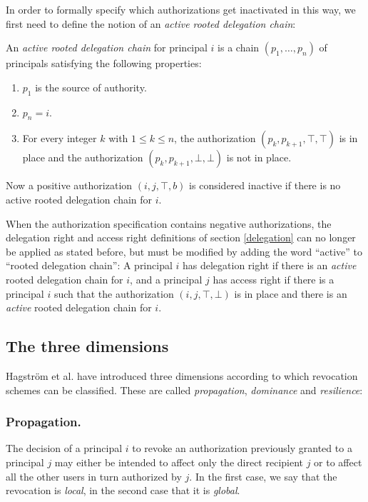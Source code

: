 \documentclass[runningheads]{llncs}
\begin{document}
In order to formally specify which authorizations get inactivated in this way, we first need to define the notion of an \emph{active rooted delegation chain}:
\begin{definition}
 An \emph{active rooted delegation chain} for principal $i$ is a chain $(p_1,\dots,p_n)$ of principals satisfying the following properties: 
 \begin{enumerate}
  \item $p_1$ is the source of authority.
  \item $p_n=i$.
  \item For every integer $k$ with $1 \leq k \leq n$, the authorization $(p_k,p_{k+1},\top,\top)$ is in place and the authorization $(p_k,p_{k+1},\bot,\bot)$ is not in place.
 \end{enumerate}
\end{definition}
Now a positive authorization $(i,j,\top,b)$ is considered inactive if there is no active rooted delegation chain for $i$. 

When the authorization specification contains negative authorizations, the delegation right and access right definitions of section \ref{delegation} can no longer be applied as stated before, but must be modified by adding the word ``active'' to ``rooted delegation chain'': A principal $i$ has delegation right if there is an \emph{active} rooted delegation chain for $i$, and a principal $j$ has access right if there is a principal $i$ such that the authorization $(i,j,\top,\bot)$ is in place and there is an \emph{active} rooted delegation chain for $i$.

\subsection{The three dimensions}
Hagstr\"om et al. \cite{Hagstrom} have introduced three dimensions according to which revocation schemes can be classified. These are called \emph{propagation}, \emph{dominance} and \emph{resilience}:

\subsubsection{Propagation.} 
The decision of a principal $i$ to revoke an authorization previously granted to a principal $j$ may either be intended to affect only the direct recipient $j$ or to affect all the other users in turn authorized by $j$. In the first case, we say that the revocation is \emph{local}, in the second case that it is \emph{global}. 
\end{document}

